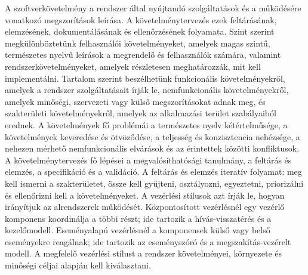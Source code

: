 \begin{summarybox}
A szoftverkövetelmény a rendszer által nyújtandó szolgáltatások és a működésére vonatkozó megszorítások leírása. A követelménytervezés ezek feltárásának, elemzésének, dokumentálásának és ellenőrzésének folyamata. Szint szerint megkülönböztetünk felhasználói követelményeket, amelyek magas szintű, természetes nyelvű leírások a megrendelő és felhasználók számára, valamint rendszerkövetelményeket, amelyek részletesen meghatározzák, mit kell implementálni. Tartalom szerint beszélhetünk funkcionális követelményekről, amelyek a rendszer szolgáltatásait írják le, nemfunkcionális követelményekről, amelyek minőségi, szervezeti vagy külső megszorításokat adnak meg, és szakterületi követelményekről, amelyek az alkalmazási terület szabályaiból erednek. A követelmények fő problémái a természetes nyelv kétértelműsége, a követelmények keveredése és ötvöződése, a teljesség és konzisztencia nehézsége, a nehezen mérhető nemfunkcionális elvárások és az érintettek közötti konfliktusok. A követelménytervezés fő lépései a megvalósíthatósági tanulmány, a feltárás és elemzés, a specifikáció és a validáció. A feltárás és elemzés iteratív folyamat: meg kell ismerni a szakterületet, össze kell gyűjteni, osztályozni, egyeztetni, priorizálni és ellenőrizni kell a követelményeket. A vezérlési stílusok azt írják le, hogyan irányítjuk az alrendszerek működését. Központosított vezérlésnél egy vezérlő komponens koordinálja a többi részt; ide tartozik a hívás-visszatérés és a kezelőmodell. Eseményalapú vezérlésnél a komponensek külső vagy belső eseményekre reagálnak; ide tartozik az eseményszóró és a megszakítás-vezérelt modell. A megfelelő vezérlési stílust a rendszer követelményei, környezete és minőségi céljai alapján kell kiválasztani.
\end{summarybox}
